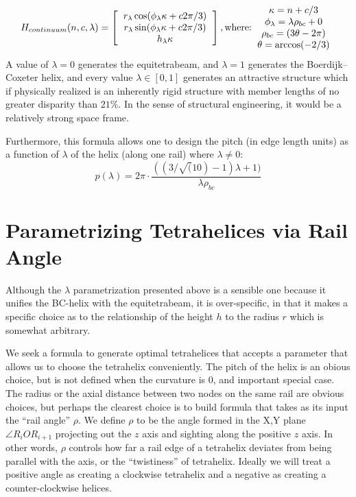 \documentclass[11pt]{article}
\begin{document}
\[
H_{continuum}(n,c,\lambda) =
\left [
  \begin{tabular}{c}
   $ r_{\lambda} \cos(\phi_{\lambda} \kappa + c 2 \pi /3) $\\
   $ r_{\lambda}  \sin(\phi_{\lambda} \kappa + c 2 \pi /3) $\\
   $ h_{\lambda} \kappa $
  \end{tabular}
  \right ],
\text{where:}
  \begin{tabular}{c}
    $\kappa = n + c/3$ \\
    $ \phi_{\lambda} =  \lambda \rho_{bc}  + 0 $\\
    $\rho_{bc} = (3 \theta - 2 \pi)$ \\
   $ \theta = \arccos(-2/3) $
  \end{tabular}      
\]
A value of $\lambda = 0$ generates the equitetrabeam, and $\lambda = 1$ generates the Boerdijk--Coxeter helix, and every
value $\lambda \in [0,1]$ generates an attractive structure which if physically realized is an inherently rigid structure
with member lengths of no greater disparity than $21\%$.
In the sense of structural engineering, it would be a relatively strong space frame.

Furthermore, this formula allows one to design the pitch (in edge length units) as a function of $\lambda$ of the helix (along one rail)
where $\lambda \neq 0$:
\[
p(\lambda) = 2 \pi  \cdot \frac{((3/\sqrt(10) -1) \lambda +1)}{ \lambda  \rho_{bc} }
\]

\section{Parametrizing Tetrahelices via Rail Angle}

Although the $\lambda$ parametrization presented above is a sensible one
because it unifies the BC-helix with the equitetrabeam, it is over-specific,
in that it makes a specific choice as to the relationship of the height $h$
to the radius $r$ which is somewhat arbitrary.

We seek a formula to generate optimal tetrahelices that accepts a
parameter that allows us to choose the tetrahelix conveniently. The
pitch of the helix is an obious choice, but is not defined when the
curvature is $0$, and important special case. The radius or the axial
distance between two nodes on the same rail are obvious choices, but
perhaps the clearest choice is to build formula that takes as its
input the ``rail angle'' $\rho$. We define $\rho$ to be the angle
formed in the X,Y plane $\angle R_i O R_{i+1}$ projecting out the $z$
axis and sighting along the positive $z$ axis. In other words, $\rho$
controls how far a rail edge of a tetrahelix deviates from being
parallel with the axis, or the ``twistiness'' of tetrahelix. Ideally
we will treat a positive angle as creating a clockwise tetrahelix and
a negative as creating a counter-clockwise helices.
\end{document}
